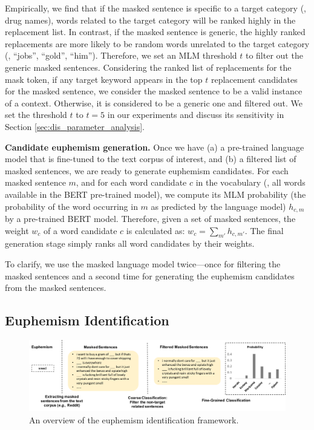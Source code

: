 Empirically, we find that if the masked sentence is specific to a target category (\eg, drug names), words related to the target category will be ranked highly in the replacement list. 
In contrast, if the masked sentence is generic, the highly ranked replacements are more likely  to be random words unrelated to the target category (\eg, ``jobs'', ``gold'', ``him''). 
Therefore, we set an MLM threshold $t$ to filter out the generic masked sentences. 
Considering the ranked list of replacements for the mask token, if any target keyword appears in the top $t$ replacement candidates for the masked sentence, we consider  the masked sentence to be a valid instance of a context. 
Otherwise, it is considered to be a generic one and filtered out. 
We set the threshold $t$ to $t=5$ in our experiments and discuss its  sensitivity in Section \ref{sec:dis_parameter_analysis}. 


\noindent\textbf{Candidate euphemism generation.} 
Once we have (a) a pre-trained language model that is fine-tuned to the text corpus of interest, and (b) a filtered list of masked sentences, we are ready to  generate euphemism candidates. 
For each masked sentence $m$, and for each word candidate $c$ in the vocabulary (\ie, all words available in the BERT pre-trained model), we compute its MLM probability (the probability of the word occurring in $m$ as predicted by the language model) $h_{c,m}$  by a pre-trained BERT model.
Therefore, given a set of masked sentences, the weight $w_{c}$ of a word candidate $c$ is calculated as: 
$w_c = \sum_{m'}h_{c, m'}$. 
The final generation stage simply ranks all word candidates by their weights. 

To clarify, we use the masked language model twice---once for filtering the masked sentences and a second time for generating the euphemism candidates from the masked sentences. 


\subsection{Euphemism Identification}
\label{sec:model_iden}
\begin{figure}
	\centering
	\includegraphics[width=1.00\linewidth]{figures/3}
	\caption{An overview of the euphemism identification framework.}
	\label{fig:model_iden}
\end{figure}

